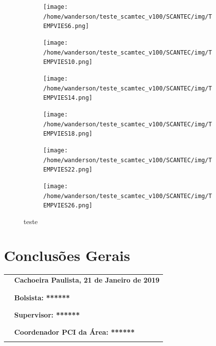 \documentclass[11pt]{article}
\begin{document}
\begin{figure}[H]
\centering
\begin{subfigure}
    \centering
    \texttt{[image: /home/wanderson/teste\_scamtec\_v100/SCANTEC/img/TEMPVIES6.png]}
\end{subfigure}
\hspace{1mm}
\begin{subfigure}
    \centering
    \texttt{[image: /home/wanderson/teste\_scamtec\_v100/SCANTEC/img/TEMPVIES10.png]}
\end{subfigure}
\hspace{1mm}
\begin{subfigure}
    \centering
    \texttt{[image: /home/wanderson/teste\_scamtec\_v100/SCANTEC/img/TEMPVIES14.png]}
\end{subfigure}
\hspace{1mm}
\begin{subfigure}
    \centering
    \texttt{[image: /home/wanderson/teste\_scamtec\_v100/SCANTEC/img/TEMPVIES18.png]}
\end{subfigure}
\begin{subfigure}
    \centering
    \texttt{[image: /home/wanderson/teste\_scamtec\_v100/SCANTEC/img/TEMPVIES22.png]}
\end{subfigure}
\hspace{1mm}
\begin{subfigure}
    \centering
    \texttt{[image: /home/wanderson/teste\_scamtec\_v100/SCANTEC/img/TEMPVIES26.png]}
\end{subfigure}
\caption{ teste }
\label{fig:comp_prec_bam_gsi_24}
\end{figure}

\newpage

\section{Conclusões Gerais}

\newpage


\begin{center}
    \begin{flushright}
        \begin{tabular}{@{}p{.5in}p{4in}@{}}
            & \textbf{Cachoeira Paulista, 21 de Janeiro de 2019}\\ \\
            & \hrulefill\\
            & \textbf{Bolsista: ******}\\ \\
            & \hrulefill\\
            & \textbf{Supervisor: ******}\\ \\
            & \hrulefill\\
            & \textbf{Coordenador PCI da Área: ******}\\ \\
        \end{tabular}
    \end{flushright}
\end{center}
\end{document}
